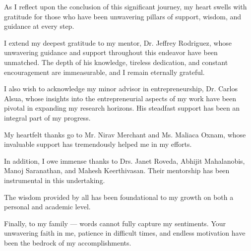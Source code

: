 As I reflect upon the conclusion of this significant journey, my heart swells with gratitude for those who have been unwavering pillars of support, wisdom, and guidance at every step.

I extend my deepest gratitude to my mentor, Dr\@. Jeffrey Rodriguez, whose unwavering guidance and support throughout this endeavor have been unmatched. The depth of his knowledge, tireless dedication, and constant encouragement are immeasurable, and I remain eternally grateful.

I also wish to acknowledge my minor advisor in entrepreneurship, Dr\@. Carlos Alsua, whose insights into the entrepreneurial aspects of my work have been pivotal in expanding my research horizons. His steadfast support has been an integral part of my progress.

My heartfelt thanks go to Mr\@. Nirav Merchant and Ms\@. Maliaca Oxnam, whose invaluable support has tremendously helped me in my efforts.

In addition, I owe immense thanks to Drs\@. Janet Roveda, Abhijit Mahalanobis, Manoj Saranathan, and Mahesh Keerthivasan. Their mentorship has been instrumental in this undertaking.

The wisdom provided by all has been foundational to my growth on both a personal and academic level.

Finally, to my family --- words cannot fully capture my sentiments. Your unwavering faith in me, patience in difficult times, and endless motivation have been the bedrock of my accomplishments.

